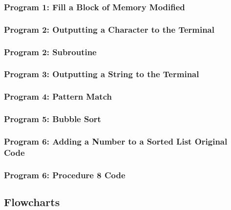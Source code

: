 \documentclass[12pt, twocolumn]{article}
\begin{document}
\subsubsection{Program 1: \normalfont Fill a Block of Memory Modified}\label{Prog1}

\subsubsection{Program 2: \normalfont Outputting a Character to the Terminal}\label{Prog2}

\subsubsection{Program 2: \normalfont Subroutine}\label{Prog2sub}

\subsubsection{Program 3: \normalfont Outputting a String to the Terminal}\label{Prog3}


\subsubsection{Program 4: \normalfont Pattern Match}\label{Prog4}

\subsubsection{Program 5: \normalfont Bubble Sort}\label{Prog5}

\subsubsection{Program 6: \normalfont Adding a Number to a Sorted List Original Code}\label{Prog6}

\subsubsection{Program 6: \normalfont Procedure 8 Code}\label{Prog68}


\subsection{Flowcharts}\label{flowchart}
\end{document}
